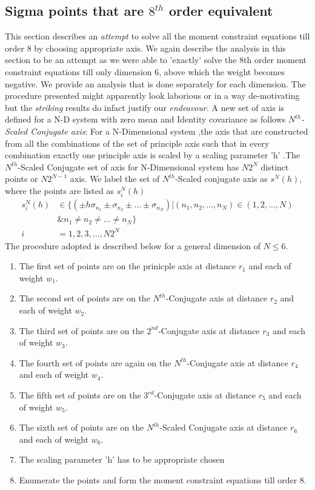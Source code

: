 \documentclass[letterpaper, 10 pt, conference]{ieeeconf}  %
\begin{document}
\subsection{Sigma points that are $8^{th}$ order equivalent}
This section describes an  \emph{attempt} to solve all the moment constraint equations till order 8 by choosing appropriate axis. We again describe the analysis in this section to be an attempt as we were able to 'exactly' solve the 8th order moment constraint equations till only dimension $6$, above which the weight becomes negative. We provide an analysis that is done separately for each dimension. The procedure presented might apparently look laborious or in a way de-motivating but the \emph{striking} results do infact justify our \emph{endeavour}. A new set of axis is defined for a N-D system with zero mean and Identity covariance as follows\newline
\emph{$N^{th}$-Scaled Conjugate axis}: For a N-Dimensional system ,the axis that are constructed from all the combinations of the set of principle axis such that in every combination exactly one principle axis is scaled by a scaling parameter 'h' .The $N^{th}$-Scaled Conjugate set of axis for N-Dimensional system has $N2^N$ distinct points or $N2^{N-1}$ axis. We label the set of $N^{th}$-Scaled conjugate axis as $s^N(h)$, where the points are listed as $s^N_i(h)$ 
\setlength{\arraycolsep}{0.0em}
\begin{eqnarray}
s^N_i(h) &\in \{(\pm h\sigma_{n_1}\pm\sigma_{n_2} \pm ...\pm \sigma_{n_N})|(n_1,n_2,...,n_N)\in (1,2,...,N) \\
&\& n_1\ne n_2\ne...\ne n_N \}\\
i&=1,2,3,...,N2^N 
\end{eqnarray}
\setlength{\arraycolsep}{5pt}
The procedure adopted is described below for a general dimension of $N \le 6$.   
\begin{enumerate}
\item The first set of points are on the prinicple axis at distance $r_1$ and each of weight $w_1$.
\item The second set of points are on the $N^{th}$-Conjugate axis at distance $r_2$ and each of weight $w_2$.
\item The third set of points are on the $2^{nd}$-Conjugate axis at distance $r_3$ and each of weight $w_3$.
\item The fourth set of points are again on the $N^{th}$-Conjugate axis at distance $r_4$ and each of weight $w_4$.
\item The fifth set of points are on the $3^{rd}$-Conjugate axis at distance $r_5$ and each of weight $w_5$.
\item The sixth set of points are on the $N^{th}$-Scaled Conjugate axis at distance $r_6$ and each of weight $w_6$.
\item The scaling parameter 'h' has to be appropriate chosen
\item Enumerate the points and form the moment constraint equations till order 8.
\end{enumerate}
\end{document}
